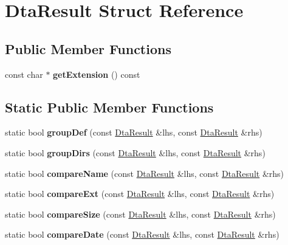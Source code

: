 \hypertarget{structDtaResult}{\section{Dta\-Result Struct Reference}
\label{structDtaResult}
}
\subsection*{Public Member Functions}
\begin{DoxyCompactItemize}
\item 
\hypertarget{structDtaResult_a6f67f37832a4ad25e67913784dab84ef}{const char $\ast$ {\bfseries get\-Extension} () const }\label{structDtaResult_a6f67f37832a4ad25e67913784dab84ef}

\end{DoxyCompactItemize}
\subsection*{Static Public Member Functions}
\begin{DoxyCompactItemize}
\item 
\hypertarget{structDtaResult_afd4dfbc9163e919afe50e716a36dccbf}{static bool {\bfseries group\-Def} (const \hyperlink{structDtaResult}{Dta\-Result} \&lhs, const \hyperlink{structDtaResult}{Dta\-Result} \&rhs)}\label{structDtaResult_afd4dfbc9163e919afe50e716a36dccbf}

\item 
\hypertarget{structDtaResult_a4fb460e4a57451b341a1e9cb67fe62fd}{static bool {\bfseries group\-Dirs} (const \hyperlink{structDtaResult}{Dta\-Result} \&lhs, const \hyperlink{structDtaResult}{Dta\-Result} \&rhs)}\label{structDtaResult_a4fb460e4a57451b341a1e9cb67fe62fd}

\item 
\hypertarget{structDtaResult_a049b082be8ef1a735478fec0b39c9c71}{static bool {\bfseries compare\-Name} (const \hyperlink{structDtaResult}{Dta\-Result} \&lhs, const \hyperlink{structDtaResult}{Dta\-Result} \&rhs)}\label{structDtaResult_a049b082be8ef1a735478fec0b39c9c71}

\item 
\hypertarget{structDtaResult_af413af08afafef36ba90f36404587473}{static bool {\bfseries compare\-Ext} (const \hyperlink{structDtaResult}{Dta\-Result} \&lhs, const \hyperlink{structDtaResult}{Dta\-Result} \&rhs)}\label{structDtaResult_af413af08afafef36ba90f36404587473}

\item 
\hypertarget{structDtaResult_a149b47dfce52831f46edc89a46891095}{static bool {\bfseries compare\-Size} (const \hyperlink{structDtaResult}{Dta\-Result} \&lhs, const \hyperlink{structDtaResult}{Dta\-Result} \&rhs)}\label{structDtaResult_a149b47dfce52831f46edc89a46891095}

\item 
\hypertarget{structDtaResult_a7abe980d46eebd0509f34978778be3f9}{static bool {\bfseries compare\-Date} (const \hyperlink{structDtaResult}{Dta\-Result} \&lhs, const \hyperlink{structDtaResult}{Dta\-Result} \&rhs)}\label{structDtaResult_a7abe980d46eebd0509f34978778be3f9}

\end{DoxyCompactItemize}
